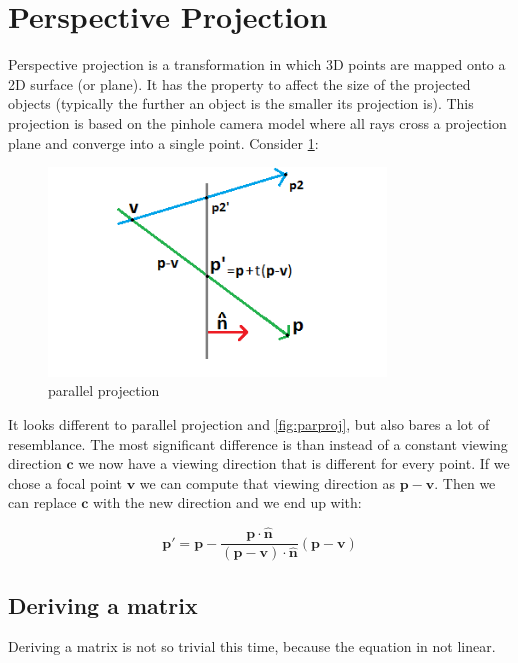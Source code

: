 \documentclass[]{report}   %
\begin{document}
\section{Perspective Projection}

Perspective projection is a transformation in which 3D points are mapped onto a 2D surface (or plane). It has the property to affect the size of the projected objects (typically the further an object is the smaller its projection is). This projection is based on the pinhole camera model where all rays cross a projection plane and converge into a single point. Consider \ref{fig:persproj}: 
\begin{figure}[htb]
\centering
\includegraphics[width=0.8\textwidth]{persp-projection-diagram}
\caption{parallel projection}
\label{fig:persproj}
\end{figure}

It looks different to parallel projection and \ref{fig:parproj}, but also bares a lot of resemblance. The most significant difference is than instead of a constant viewing direction \(\mathbf{c}\) we now have a viewing direction that is different for every point. If we chose a focal point \(\mathbf{v}\) we can compute that viewing direction as \(\mathbf{p}-\mathbf{v}\). Then we can replace \(\mathbf{c}\) with the new direction and we end up with:
\begin{mdframed}
\[
	\mathbf{p\prime} = \mathbf{p} - \frac{\mathbf{p} \cdot \mathbf{\hat{n}}}{(\mathbf{p}-\mathbf{v}) \cdot \mathbf{\hat{n}}} 
	(\mathbf{p}-\mathbf{v})
\]
\end{mdframed}


\subsection{Deriving a matrix}

Deriving a matrix is not so trivial this time, because the equation in not linear.
\end{document}
